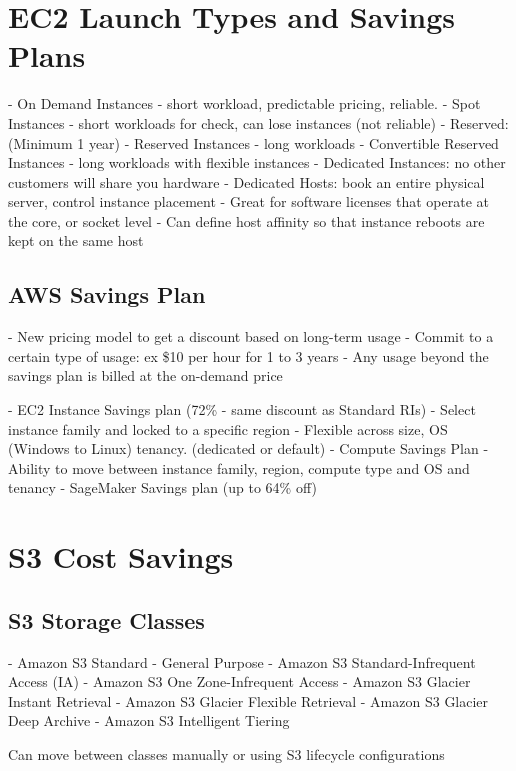 \documentclass[11pt]{book}
\begin{document}
    \section{EC2 Launch Types and Savings Plans}
    - On Demand Instances - short workload, predictable pricing, reliable.
    - Spot Instances - short workloads for check, can lose instances (not reliable)
    - Reserved: (Minimum 1 year)
    - Reserved Instances - long workloads
    - Convertible Reserved Instances - long workloads with flexible instances
    - Dedicated Instances: no other customers will share you hardware
    - Dedicated Hosts: book an entire physical server, control instance placement
    - Great for software licenses that operate at the core, or socket level
    - Can define host affinity so that instance reboots are kept on the same host

    \subsection{AWS Savings Plan}
    - New pricing model to get a discount based on long-term usage
    - Commit to a certain type of usage: ex \$10 per hour for 1 to 3 years
    - Any usage beyond the savings plan is billed at the on-demand price

    - EC2 Instance Savings plan (72\% - same discount as Standard RIs)
    - Select instance family and locked to a specific region
    - Flexible across size, OS (Windows to Linux) tenancy. (dedicated or default)
    - Compute Savings Plan
    - Ability to move between instance family, region, compute type and OS and tenancy
    - SageMaker Savings plan (up to 64\% off)


    \section{S3 Cost Savings}

    \subsection{S3 Storage Classes}
    - Amazon S3 Standard - General Purpose
    - Amazon S3 Standard-Infrequent Access (IA)
    - Amazon S3 One Zone-Infrequent Access
    - Amazon S3 Glacier Instant Retrieval
    - Amazon S3 Glacier Flexible Retrieval
    - Amazon S3 Glacier Deep Archive
    - Amazon S3 Intelligent Tiering

    Can move between classes manually or using S3 lifecycle configurations
\end{document}
